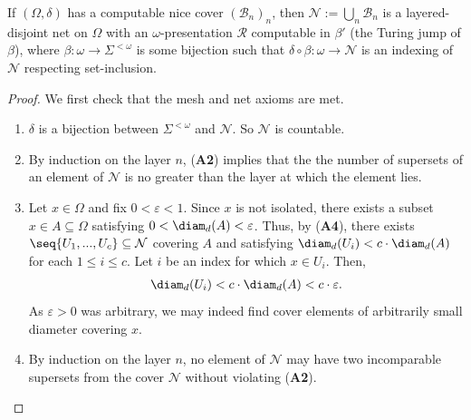 \begin{proposition}
    If $(\Omega, \delta)$ has a computable nice cover $(\mathcal{B}_n)_n$, then $\mathcal{N} := \bigcup_n \mathcal{B}_n$ is a layered-disjoint net on $\Omega$ with an $\omega$-presentation $\mathscr{R}$ computable in $\beta'$ (the Turing jump of $\beta$), where $\beta : \omega \to \Sigma^{<\omega}$ is some bijection such that $\delta \circ \beta : \omega \to \mathcal{N}$ is an indexing of $\mathcal{N}$ respecting set-inclusion.
\end{proposition}
\begin{proof}
    We first check that the mesh and net axioms are met.
    \begin{enumerate}
        \item[(\textbf{M1})] $\delta$ is a bijection between $\Sigma^{<\omega}$ and $\mathcal{N}$. So $\mathcal{N}$ is countable.
        \item[(\textbf{M2})] By induction on the layer $n$, (\textbf{A2}) implies that the the number of supersets of an element of $\mathcal{N}$ is no greater than the layer at which the element lies. 
        \item[(\textbf{M3})] Let $x \in \Omega$ and fix $0 < \varepsilon < 1$. Since $x$ is not isolated, there exists a subset $x \in A \subseteq \Omega$ satisfying $0 < \diam_d(A) < \varepsilon$. Thus, by (\textbf{A4}), there exists $\seq{U_1, ..., U_c} \subseteq \mathcal{N}$ covering $A$ and satisfying $\diam_d (U_i) < c \cdot \diam_d (A)$ for each $1 \leq i \leq c$. Let $i$ be an index for which $x \in U_i$. Then,
        \begin{align*}
            \diam_d(U_i) < c \cdot \diam_d(A) < c \cdot \varepsilon. 
        \end{align*}
        As $\varepsilon > 0$ was arbitrary, we may indeed find cover elements of arbitrarily small diameter covering $x$. 
        \item[(\textbf{N4}$'$)] By induction on the layer $n$, no element of $\mathcal{N}$ may have two incomparable supersets from the cover $\mathcal{N}$ without violating (\textbf{A2}).
    \end{enumerate}


\end{proof}
